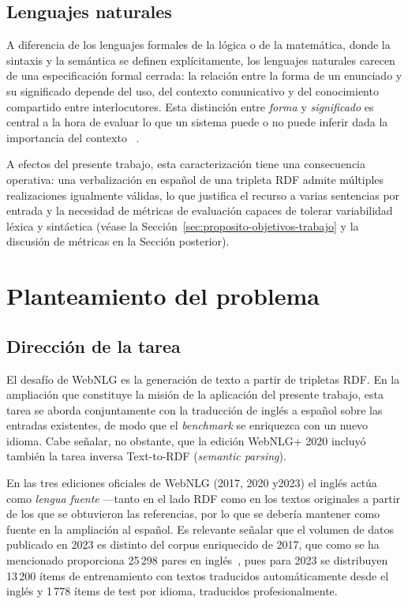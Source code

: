 \subsection{Lenguajes naturales}

A diferencia de los lenguajes formales de la lógica o de la matemática, donde
la sintaxis y la semántica se definen explícitamente, los lenguajes naturales
carecen de una especificación formal cerrada: la relación entre la forma de un
enunciado y su significado depende del uso, del contexto comunicativo y del
conocimiento compartido entre interlocutores. Esta distinción entre
\emph{forma} y \emph{significado} es central a la hora de evaluar lo que un
sistema puede o no puede inferir dada la importancia del contexto
~\cite{BenderKoller2020_NLU}.

A efectos del presente trabajo, esta caracterización tiene una consecuencia
operativa: una verbalización en español de una tripleta RDF admite múltiples
realizaciones igualmente válidas, lo que justifica el recurso a varias
sentencias por entrada y la necesidad de métricas de evaluación capaces
de tolerar variabilidad léxica y sintáctica (véase la
Sección~\ref{sec:proposito-objetivos-trabajo} y la discusión de métricas en la
Sección posterior).

\section{Planteamiento del problema}

\subsection{Dirección de la tarea}

El desafío de WebNLG es la generación de texto a partir de tripletas RDF. En la
ampliación que constituye la misión de la aplicación del presente trabajo,
esta tarea se aborda conjuntamente con la traducción de inglés a español sobre las entradas
existentes, de modo que el \textit{benchmark} se enriquezca con un nuevo
idioma. Cabe señalar, no obstante, que la edición WebNLG+ 2020 incluyó también
la tarea inversa Text-to-RDF (\textit{semantic parsing}).

En las tres ediciones oficiales de WebNLG (2017, 2020 y2023) el inglés actúa como
\emph{lengua fuente} ---tanto en el lado RDF como en
los textos originales a partir de los que se obtuvieron las referencias, por lo que
se debería mantener como fuente en la ampliación al español. Es relevante señalar que
el volumen de datos publicado en 2023 es distinto del corpus enriquecido de 2017,
que como se ha mencionado proporciona 25\,298 pares en inglés~\cite{CastroFerreira2019},
pues para 2023 se distribuyen
13\,200 ítems de entrenamiento con textos traducidos automáticamente desde el
inglés y 1\,778 ítems de test por idioma, traducidos profesionalmente.

